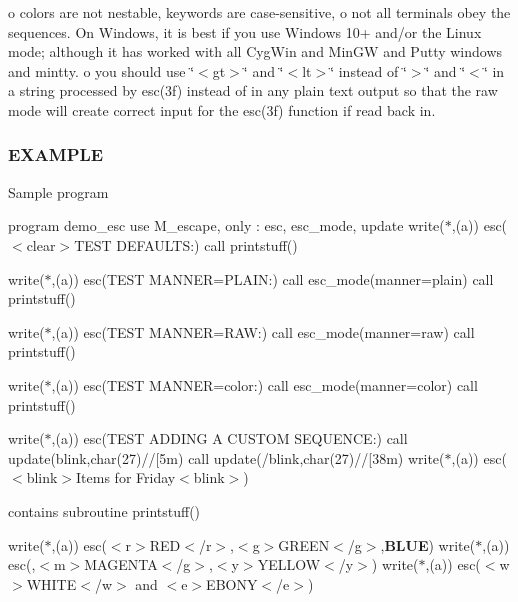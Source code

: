 o colors are not nestable, keywords are case-\/sensitive, o not all terminals obey the sequences. On Windows, it is best if you use Windows 10+ and/or the Linux mode; although it has worked with all Cyg\+Win and Min\+GW and Putty windows and mintty. o you should use \char`\"{}$<$gt$>$\char`\"{} and \char`\"{}$<$lt$>$\char`\"{} instead of \char`\"{}$>$\char`\"{} and \char`\"{}$<$\char`\"{} in a string processed by esc(3f) instead of in any plain text output so that the raw mode will create correct input for the esc(3f) function if read back in.

\subsubsection*{E\+X\+A\+M\+P\+LE}

Sample program

program demo\+\_\+esc use M\+\_\+escape, only \+: esc, esc\+\_\+mode, update write($\ast$,\textquotesingle{}(a)\textquotesingle{}) esc(\textquotesingle{}$<$clear$>$T\+E\+ST D\+E\+F\+A\+U\+L\+TS\+:\textquotesingle{}) call printstuff()

write($\ast$,\textquotesingle{}(a)\textquotesingle{}) esc(\textquotesingle{}T\+E\+ST M\+A\+N\+N\+ER=P\+L\+A\+IN\+:\textquotesingle{}) call esc\+\_\+mode(manner=\textquotesingle{}plain\textquotesingle{}) call printstuff()

write($\ast$,\textquotesingle{}(a)\textquotesingle{}) esc(\textquotesingle{}T\+E\+ST M\+A\+N\+N\+ER=R\+AW\+:\textquotesingle{}) call esc\+\_\+mode(manner=\textquotesingle{}raw\textquotesingle{}) call printstuff()

write($\ast$,\textquotesingle{}(a)\textquotesingle{}) esc(\textquotesingle{}T\+E\+ST M\+A\+N\+N\+ER=color\+:\textquotesingle{}) call esc\+\_\+mode(manner=\textquotesingle{}color\textquotesingle{}) call printstuff()

write($\ast$,\textquotesingle{}(a)\textquotesingle{}) esc(\textquotesingle{}T\+E\+ST A\+D\+D\+I\+NG A C\+U\+S\+T\+OM S\+E\+Q\+U\+E\+N\+CE\+:\textquotesingle{}) call update(\textquotesingle{}blink\textquotesingle{},char(27)//\textquotesingle{}\mbox{[}5m\textquotesingle{}) call update(\textquotesingle{}/blink\textquotesingle{},char(27)//\textquotesingle{}\mbox{[}38m\textquotesingle{}) write($\ast$,\textquotesingle{}(a)\textquotesingle{}) esc(\textquotesingle{}$<$blink$>$Items for Friday$<$blink$>$\textquotesingle{})

contains subroutine printstuff()

write($\ast$,\textquotesingle{}(a)\textquotesingle{}) esc(\textquotesingle{}$<$r$>$R\+ED$<$/r$>$,$<$g$>$G\+R\+E\+EN$<$/g$>$,{\bfseries B\+L\+UE}\textquotesingle{}) write($\ast$,\textquotesingle{}(a)\textquotesingle{}) esc(,$<$m$>$M\+A\+G\+E\+N\+TA$<$/g$>$,$<$y$>$Y\+E\+L\+L\+OW$<$/y$>$\textquotesingle{}) write($\ast$,\textquotesingle{}(a)\textquotesingle{}) esc(\textquotesingle{}$<$w$>$W\+H\+I\+TE$<$/w$>$ and $<$e$>$E\+B\+O\+NY$<$/e$>$\textquotesingle{})

